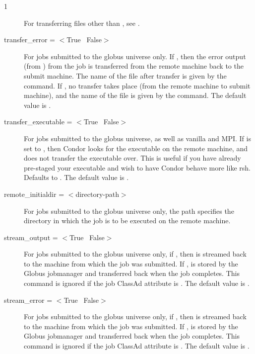 \begin{ManPage}{\label{man-condor-submit}}{1}
\begin{description}
For transferring files other than ,
see .

\item[transfer\_error = $<$True \Bar\ False$>$]
For jobs submitted to the globus universe only.
If , then the error output (from ) from the job
is transferred from the remote machine back to the submit machine.
The name of the file after transfer is given
by the  command.
If , no transfer takes place (from the remote machine
to submit machine),
and the name of the file is given
by the  command.
The default value is .


\item[transfer\_executable = $<$True \Bar\ False$>$]
For jobs submitted to the globus universe, as well as vanilla and MPI.
If  is set to
, then Condor looks for the executable on the remote machine, and
does not transfer the executable over.
This is useful if you have already pre-staged your
executable and wish to have Condor behave more like rsh.
Defaults to .
The default value is .

\item[remote\_initialdir = $<$directory-path$>$] 
For jobs submitted to the globus universe only,
the path specifies the directory in which the job is to be
executed on the remote machine.


\item[stream\_output = $<$True \Bar\ False$>$] 
For jobs submitted to the globus universe only,
if , then  is streamed back to
the machine from which the job was submitted. 
If ,  is stored by the Globus jobmanager 
and transferred back when the job completes.
This command is ignored if the job ClassAd attribute
 is
.
The default value is .

\item[stream\_error = $<$True \Bar\ False$>$] 
For jobs submitted to the globus universe only,
if , then  is streamed back to
the machine from which the job was submitted. 
If ,  is stored by the Globus jobmanager 
and transferred back when the job completes.
This command is ignored if the job ClassAd attribute
 is
.
The default value is .


\end{description}
\end{ManPage}
